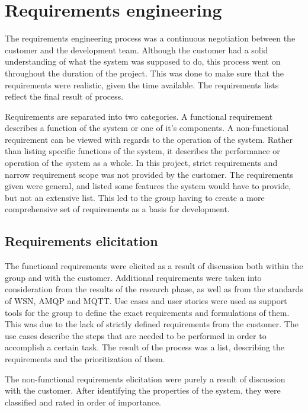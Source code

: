 
\chapter{Requirements engineering}
\label{ch:requirements_engineering}

The requirements engineering process was a continuous negotiation between the customer and the development team. Although the customer had a solid understanding of what the system was supposed to do, this process went on throughout the duration of the project. This was done to make sure that the requirements were realistic, given the time available. The requirements lists reflect the final result of process.

Requirements are separated into two categories. A functional requirement describes a function of the system or one of it's components. A non-functional requirement can be viewed with regards to the operation of the system. Rather than listing specific functions of the system, it describes the performance or operation of the system as a whole. In this project, strict requirements and narrow requirement scope was not provided by the customer. The requirements given were general, and listed some features the system would have to provide, but not an extensive list. This led to the group having to create a more comprehensive set of requirements as a basis for development.

\section{Requirements elicitation}
\label{sec:requirements_engineering-requirements_elicitation}

The functional requirements were elicited as a result of discussion both within the group and with the customer. Additional requirements were taken into consideration from the results of the research phase, as well as from the standards of WSN, AMQP and MQTT. Use cases and user stories were used as support tools for the group to define the exact requirements and formulations of them. This was due to the lack of strictly defined requirements from the customer. The use cases describe the steps that are needed to be performed in order to accomplish a certain task. The result of the process was a list, describing the requirements and the prioritization of them.

The non-functional requirements elicitation were purely a result of discussion with the customer. After identifying the properties of the system, they were classified and rated in order of importance.


